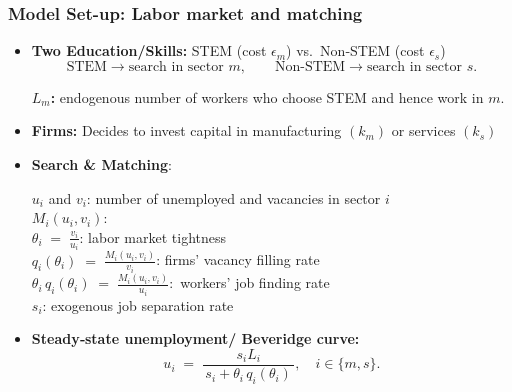 \documentclass[9pt,xcolor={svgnames}]{beamer}
\begin{document}
\begin{frame}
\frametitle{Model Set-up: Labor market and matching}
\vspace{1em}
 \begin{itemize}
    \item \textbf{Two Education/Skills:} STEM (cost $\epsilon_m$) vs.\ Non‐STEM (cost $\epsilon_s$) 
      \[
        \text{STEM} \to \text{search in sector }m ,\quad \quad 
        \text{Non‐STEM} \to \text{search in sector }s.
      \]

  \textbf{$L_m$:} endogenous number of workers who choose STEM and hence work in $m$.

  \vspace{1em}
  
\item \textbf{Firms:} Decides to invest capital in manufacturing $(k_m)$ or services $(k_s)$

    \vspace{1em}
    
    \item \textbf{Search \& Matching}:    
      
  $ u_i$ and $v_i$:   \quad number of unemployed and vacancies in sector $i$\\
  \vspace{1mm}
    $ M_i(u_i,v_i)$: \quad {}  \\
\vspace{1mm}
       $ \theta_i \;=\; \frac{v_i}{u_i}$: \quad  labor market tightness \\
       \vspace{1mm}
       $ q_i(\theta_i) \;=\; \frac{M_i(u_i,v_i)}{v_i}$: \quad  firms' vacancy filling rate\\
       \vspace{1mm}
      $  \theta_i\,q_i(\theta_i) \;=\;\frac{M_i(u_i,v_i)}{u_i}:$ \quad 
      workers' job finding rate \\

\vspace{1mm}
    $s_i$: exogenous job separation rate
      \vspace{1mm}
      
     \item \textbf{Steady‐state unemployment/ Beveridge curve:}
      \[
        u_i \;=\; \frac{s_iL_i}{\,s_i + \theta_i\,q_i(\theta_i)\,}, 
        \quad i\in\{m,s\}.
      \]
  \end{itemize}
\end{frame}
\end{document}
